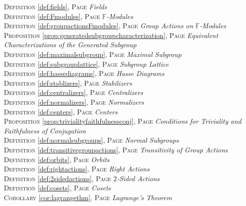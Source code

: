 \begin{multicols}{2}
{\textsc{Definition} \ref{def:fields}, \textsc{Page} \pageref{def:fields} \textit{Fields} \\
\textsc{Definition} \ref{def:Fmodules}, \textsc{Page} \pageref{def:Fmodules} \textit{\(\mathbb {F}\)-Modules} \\
\textsc{Definition} \ref{def:groupactionsFmodules}, \textsc{Page} \pageref{def:groupactionsFmodules} \textit{Group Actions on \(\mathbb {F}\)-Modules} \\
\textsc{Proposition} \ref{prop:generatedsubgroupcharacterization}, \textsc{Page} \pageref{prop:generatedsubgroupcharacterization} \textit{Equivalent Characterizations of the Generated Subgroup} \\
\textsc{Definition} \ref{def:maximalsubgroup}, \textsc{Page} \pageref{def:maximalsubgroup} \textit{Maximal Subgroup} \\
\textsc{Definition} \ref{def:subgrouplattice}, \textsc{Page} \pageref{def:subgrouplattice} \textit{Subgroup Lattice} \\
\textsc{Definition} \ref{def:hassediagrams}, \textsc{Page} \pageref{def:hassediagrams} \textit{Hasse Diagrams} \\
\textsc{Definition} \ref{def:stablizers}, \textsc{Page} \pageref{def:stablizers} \textit{Stabilizers} \\
\textsc{Definition} \ref{def:centralizers}, \textsc{Page} \pageref{def:centralizers} \textit{Centralizers} \\
\textsc{Definition} \ref{def:normalizers}, \textsc{Page} \pageref{def:normalizers} \textit{Normalizers} \\
\textsc{Definition} \ref{def:centers}, \textsc{Page} \pageref{def:centers} \textit{Centers} \\
\textsc{Proposition} \ref{prop:trivialityfaithfulnessconj}, \textsc{Page} \pageref{prop:trivialityfaithfulnessconj} \textit{Conditions for Triviality and Faithfulness of Conjugation} \\
\textsc{Definition} \ref{def:normalsubgroups}, \textsc{Page} \pageref{def:normalsubgroups} \textit{Normal Subgroups} \\
\textsc{Definition} \ref{def:transitivegroupactions}, \textsc{Page} \pageref{def:transitivegroupactions} \textit{Transitivity of Group Actions} \\
\textsc{Definition} \ref{def:orbits}, \textsc{Page} \pageref{def:orbits} \textit{Orbits} \\
\textsc{Definition} \ref{def:rightactions}, \textsc{Page} \pageref{def:rightactions} \textit{Right Actions} \\
\textsc{Definition} \ref{def:2sidedactions}, \textsc{Page} \pageref{def:2sidedactions} \textit{\(2\)-Sided Actions} \\
\textsc{Definition} \ref{def:cosets}, \textsc{Page} \pageref{def:cosets} \textit{Cosets} \\
\textsc{Corollary} \ref{cor:lagrangethm}, \textsc{Page} \pageref{cor:lagrangethm} \textit{Lagrange's Theorem} \\

      }
\end{multicols}

